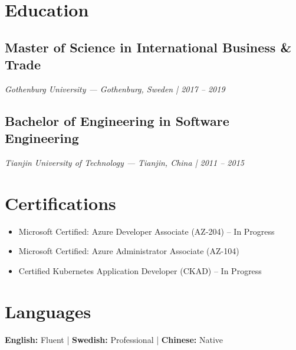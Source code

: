 \documentclass[10pt,a4paper]{article}
\begin{document}
\vspace{0.2cm}

\section*{Education}

\subsection*{Master of Science in International Business \& Trade}
\textit{Gothenburg University — Gothenburg, Sweden | 2017 -- 2019}

\subsection*{Bachelor of Engineering in Software Engineering}
\textit{Tianjin University of Technology — Tianjin, China | 2011 -- 2015}

\vspace{0.2cm}

\section*{Certifications}
\begin{itemize}[noitemsep,leftmargin=*]
\item Microsoft Certified: Azure Developer Associate (AZ-204) -- In Progress
\item Microsoft Certified: Azure Administrator Associate (AZ-104)
\item Certified Kubernetes Application Developer (CKAD) -- In Progress
\end{itemize}

\vspace{0.2cm}

\section*{Languages}
\textbf{English:} Fluent | \textbf{Swedish:} Professional | \textbf{Chinese:} Native
\end{document}

